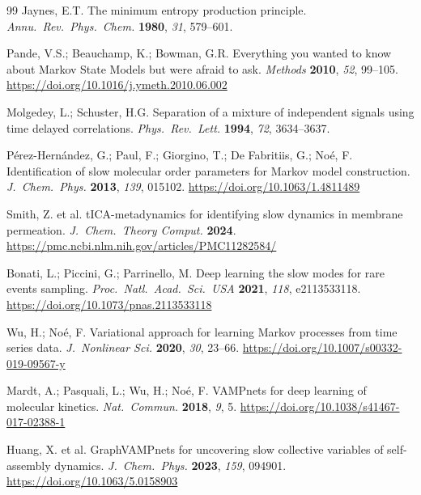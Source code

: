 \documentclass[12pt, a4paper]{article}
\begin{document}
\begin{thebibliography}{99}
Jaynes, E.T.
\newblock The minimum entropy production principle.
\newblock \emph{Annu.\ Rev.\ Phys.\ Chem.} \textbf{1980}, \emph{31}, 579--601.

Pande, V.S.; Beauchamp, K.; Bowman, G.R.
\newblock Everything you wanted to know about Markov State Models but were afraid to ask.
\newblock \emph{Methods} \textbf{2010}, \emph{52}, 99--105.
\newblock \url{https://doi.org/10.1016/j.ymeth.2010.06.002}

Molgedey, L.; Schuster, H.G.
\newblock Separation of a mixture of independent signals using time delayed correlations.
\newblock \emph{Phys.\ Rev.\ Lett.} \textbf{1994}, \emph{72}, 3634--3637.

P\'{e}rez-Hern\'{a}ndez, G.; Paul, F.; Giorgino, T.; De Fabritiis, G.; No\'{e}, F.
\newblock Identification of slow molecular order parameters for Markov model construction.
\newblock \emph{J.\ Chem.\ Phys.} \textbf{2013}, \emph{139}, 015102.
\newblock \url{https://doi.org/10.1063/1.4811489}

Smith, Z. et al.
\newblock tICA-metadynamics for identifying slow dynamics in membrane permeation.
\newblock \emph{J.\ Chem.\ Theory Comput.} \textbf{2024}.
\newblock \url{https://pmc.ncbi.nlm.nih.gov/articles/PMC11282584/}

Bonati, L.; Piccini, G.; Parrinello, M.
\newblock Deep learning the slow modes for rare events sampling.
\newblock \emph{Proc.\ Natl.\ Acad.\ Sci.\ USA} \textbf{2021}, \emph{118}, e2113533118.
\newblock \url{https://doi.org/10.1073/pnas.2113533118}

Wu, H.; No\'{e}, F.
\newblock Variational approach for learning Markov processes from time series data.
\newblock \emph{J.\ Nonlinear Sci.} \textbf{2020}, \emph{30}, 23--66.
\newblock \url{https://doi.org/10.1007/s00332-019-09567-y}

Mardt, A.; Pasquali, L.; Wu, H.; No\'{e}, F.
\newblock VAMPnets for deep learning of molecular kinetics.
\newblock \emph{Nat.\ Commun.} \textbf{2018}, \emph{9}, 5.
\newblock \url{https://doi.org/10.1038/s41467-017-02388-1}

Huang, X. et al.
\newblock GraphVAMPnets for uncovering slow collective variables of self-assembly dynamics.
\newblock \emph{J.\ Chem.\ Phys.} \textbf{2023}, \emph{159}, 094901.
\newblock \url{https://doi.org/10.1063/5.0158903}


\end{thebibliography}
\end{document}

